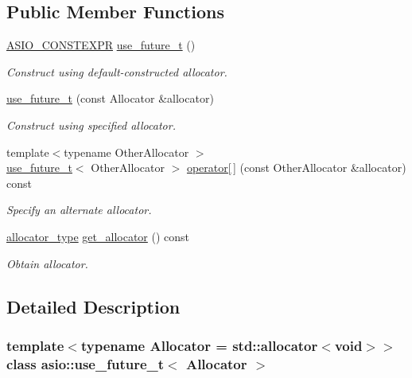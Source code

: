 \subsection*{Public Member Functions}
\begin{DoxyCompactItemize}
\item 
\hyperlink{config_8hpp_af9e880594017d068e15820dabe94e162}{A\+S\+I\+O\+\_\+\+C\+O\+N\+S\+T\+E\+X\+P\+R} \hyperlink{classasio_1_1use__future__t_aaae57aca67f960e5e037d9ea5e5488e3}{use\+\_\+future\+\_\+t} ()
\begin{DoxyCompactList}\small\item\em Construct using default-\/constructed allocator. \end{DoxyCompactList}\item 
\hyperlink{classasio_1_1use__future__t_a1a105e134a3c3587fed848d6af454ac3}{use\+\_\+future\+\_\+t} (const Allocator \&allocator)
\begin{DoxyCompactList}\small\item\em Construct using specified allocator. \end{DoxyCompactList}\item 
{\footnotesize template$<$typename Other\+Allocator $>$ }\\\hyperlink{classasio_1_1use__future__t}{use\+\_\+future\+\_\+t}$<$ Other\+Allocator $>$ \hyperlink{classasio_1_1use__future__t_ad44458a01ca996a5687fece8ccb5bf48}{operator\mbox{[}$\,$\mbox{]}} (const Other\+Allocator \&allocator) const 
\begin{DoxyCompactList}\small\item\em Specify an alternate allocator. \end{DoxyCompactList}\item 
\hyperlink{classasio_1_1use__future__t_a5f26423d6034eeba715c1249646c4700}{allocator\+\_\+type} \hyperlink{classasio_1_1use__future__t_aae2a62463ba007d968a2100f59c9eea1}{get\+\_\+allocator} () const 
\begin{DoxyCompactList}\small\item\em Obtain allocator. \end{DoxyCompactList}\end{DoxyCompactItemize}


\subsection{Detailed Description}
\subsubsection*{template$<$typename Allocator = std\+::allocator$<$void$>$$>$class asio\+::use\+\_\+future\+\_\+t$<$ Allocator $>$}

